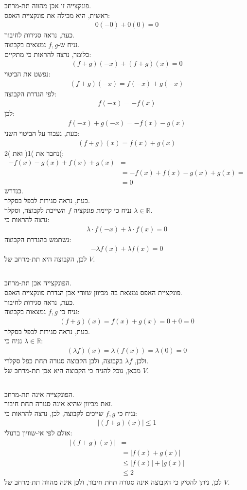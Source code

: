 \documentclass[a4paper, 12pt, leqno]{article}
\newcommand{\sub}[1]{\subsection{\underline{#1}}}
\newcommand{\eq}[1]{\begin{align*}#1\end{align*}}
\newcommand{\eqn}[1]{\begin{align}#1\end{align}}
\renewcommand{\leq}{\leqslant}
\begin{document}
\section{}
\setcounter{subsection}{3}
\sub{}
פונקצייה זו אכן מהווה תת-מרחב.\\
ראשית, היא מכילה את פונקציית האפס:
\eq{
    0(-0)+0(0)=0
}
כעת, נראה סגירות לחיבור.\\

נניח ש-$f,g$ נמצאים בקבוצה.\\
כלומר, נרצה להראות כי מתקיים:
\eq{
    (f+g)(-x)+(f+g)(x)=0
}
נפשט את הביטוי:
\eq{
    (f+g)(-x)=f(-x)+g(-x)
}
לפי הגדרת הקבוצה:
\eq{
    f(-x)=-f(x)
}
לכן:
\eqn{
    f(-x)+g(-x)=-f(x)-g(x)
}
כעת, נעבוד על הביטוי השני:
\eqn{
    (f+g)(x)=f(x)+g(x)
}
נחבר את )1( ואת )2(:
\eq{
    -f(x)-g(x)+f(x)+g(x)&=\\
    &=-f(x)+f(x)-g(x)+g(x)=\\
    &=0
}
כנדרש.\\
כעת, נראה סגירות לכפל בסקלר.\\
נניח כי קיימת פונקציה $f$ השייכת לקבוצה, וסקלר $\lambda\in\mathbb{R}$.\\
נרצה להראות כי:
\eq{
    \lambda\cdot{f}(-x)+\lambda\cdot{f}(x)=0
}
נשתמש בהגדרת הקבוצה:
\eq{
    -\lambda{f}(x)+\lambda{f}(x)=0
}
לכן, הקבוצה היא תת-מרחב של $V$.
\sub{}
הפונקצייה אכן תת-מרחב.\\
פונקציית האפס נמצאת בה מכיוון שזוהי אכן הגדרת פונקציית האפס.\\
כעת, נראה סגירות לחיבור.\\
נניח כי $f, g$ נמצאות בקבוצה:
\eq{
    (f+g)(x)=f(x)+g(x)=0+0=0
}
כעת, נראה סגירות לכפל בסקלר.\\
נניח כי $\lambda\in\mathbb{R}$:
\eq{
    (\lambda{f})(x)=\lambda(f(x))=\lambda(0)=0
}
ולכן, $\lambda{f}$ בקבוצה, ולכן הקבוצה סגורה תחת כפל סקלרי.\\
מכאן, נוכל להניח כי הקבוצה היא אכן תת-מרחב של $V$.
\sub{}
הפונקצייה אינה תת-מרחב.\\
זאת מכיוון שהיא אינה סגורה תחת חיבור.\\
נניח כי $f,g$ שייכים לקבוצה, לכן, נרצה להראות כי:
\eq{
    |(f+g)(x)|\leq{1}
}
אולם לפי אי-שוויון ברנולי:
\eq{
    |(f+g)(x)|&=\\
    &=|f(x)+g(x)|\\
    &\leq|f(x)|+|g(x)|\\
    &\leq{2}
}
לכן, ניתן להסיק כי הקבוצה אינה סגורה תחת חיבור, ולכן אינה מהווה תת-מרחב של $V$.

\setcounter{section}{25}
\end{document}
